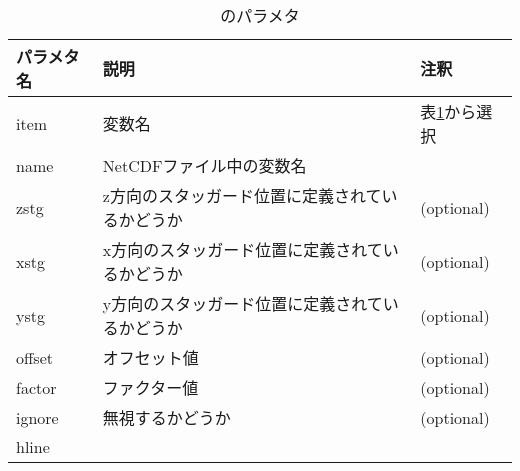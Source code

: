 {\small
\begin{table}[tbh]
\begin{center}
\caption{のパラメタ}
\label{tab:netcdf_item}
\begin{tabularx}{150mm}{llX} \hline
\rowcolor[gray]{0.9}
パラメタ名 & 説明    & 注釈 \\ \hline
item     & 変数名 & 表\ref{tab:netcdf_item}から選択   \\ \hline
name     & NetCDFファイル中の変数名 & \\ \hline
zstg     & z方向のスタッガード位置に定義されているかどうか & (optional) \\ \hline
xstg     & x方向のスタッガード位置に定義されているかどうか & (optional) \\ \hline
ystg     & y方向のスタッガード位置に定義されているかどうか & (optional) \\ \hline
offset   & オフセット値 & (optional) \\ \hline
factor   & ファクター値 & (optional) \\ \hline
ignore   & 無視するかどうか & (optional) \\ hline
\end{tabularx}
\end{center}
\end{table}
}

